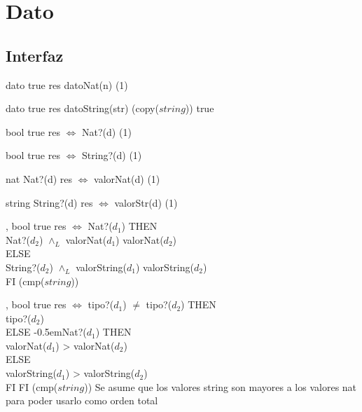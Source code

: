 \section{Dato}

\subsection{Interfaz}

\iusa{}

\ioperaciones

{} %
{dato} %
{true} %
{res \igobs datoNat(n)} %
{\bigo(1)} %
{} %
{} %

{}
{dato}
{true}
{res \igobs datoString(str)}
{\bigo(copy($string$))}
{true}
{}

{}
{bool}
{true}
{res $\iff$ Nat?(d)}
{\bigo(1)}
{}
{}

{}
{bool}
{true}
{res $\iff$ String?(d)}
{\bigo(1)}
{}
{}

{}
{nat}
{Nat?(d)}
{res $\iff$ valorNat(d)}
{\bigo(1)}
{}
{}

{}
{string}
{String?(d)}
{res $\iff$ valorStr(d)}
{\bigo(1)}
{}
{}

\operacion{$\bullet == \bullet$}
{, }
{bool}
{true}
{res $\iff$ \IFL Nat?($d_1$) THEN \\
    \hspace*{10.5em} Nat?($d_2$) $\land_L$ valorNat($d_1$) \igobs valorNat($d_2$) \\
    \hspace*{9em} ELSE \\
    \hspace*{10.5em} String?($d_2$) $\land_L$ valorString($d_1$) \igobs valorString($d_2$) \\
    \hspace*{9em} FI }
{\bigo(cmp($string$))}
{}
{}

\operacion{$\bullet > \bullet$}
{, }
{bool}
{true}
{res $\iff$ \IFL tipo?($d_1$) $\neq$ tipo?($d_2$) THEN \\
    \hspace*{10.5em} tipo?($d_2$) \\
    \hspace*{9em} ELSE {\kern-0.5em\IFL Nat?($d_1$) THEN \\
    \hspace*{10.5em} valorNat($d_1$) > valorNat($d_2$) \\
    \hspace*{9em} ELSE \\
    \hspace*{10.5em} valorString($d_1$) > valorString($d_2$) \\
    \hspace*{9em} FI} FI }
{\bigo(cmp($string$))}
{}
{Se asume que los valores string son mayores a los valores nat para poder usarlo como orden total}

